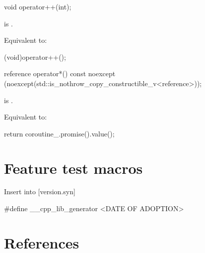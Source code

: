 \documentclass{wg21}
\begin{document}
\begin{addedblock}
\begin{itemdecl}
void operator++(int);
\end{itemdecl}

\begin{itemdescr}
\precondition {} is .

\effects
Equivalent to:
\begin{codeblock}
    (void)operator++();
\end{codeblock}
\end{itemdescr}


\begin{itemdecl}
reference operator*() const 
noexcept (noexcept(std::is_nothrow_copy_constructible_v<reference>));
\end{itemdecl}

\begin{itemdescr}
\precondition {} is .

\effects
Equivalent to:
\begin{codeblock}
    return coroutine_.promise().value();
\end{codeblock}
\end{itemdescr}
    
       
\end{addedblock}

\section{Feature test macros}

Insert into [version.syn]

\begin{addedblock}
\begin{codeblock}
    #define __cpp_lib_generator <DATE OF ADOPTION>
\end{codeblock}
\end{addedblock}
    
    
\section{References}
\renewcommand{\section}[2]{}%


\end{document}
